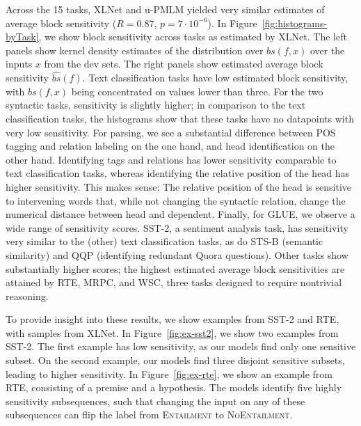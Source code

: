 \documentclass[11pt,a4paper]{article}
\begin{document}
Across the 15 tasks, XLNet and u-PMLM yielded very similar estimates of average block sensitivity ($R=0.87$, $p=7 \cdot 10^{-6}$). 
In Figure~\ref{fig:histograms-byTask}, we show block sensitivity across tasks as estimated by XLNet.
The left panels show kernel density estimates of the distribution over $bs(f,x)$ over the inputs $x$ from the dev sets.
The right panels show estimated average block sensitivity $\widehat{bs}(f)$.
Text classification tasks have low estimated block sensitivity, with $bs(f,x)$ being concentrated on values lower than three.
For the two syntactic tasks, sensitivity is slightly higher; in comparison to the text classification tasks, the histograms show that these tasks have no datapoints with very low sensitivity.
For parsing, we see a substantial difference between POS tagging and relation labeling on the one hand, and head identification on the other hand.
Identifying tags and relations has lower sensitivity comparable to text classification tasks, whereas identifying the relative position of the head has higher sensitivity.
This makes sense: The relative position of the head is sensitive to intervening words that, while not changing the syntactic relation, change the numerical distance between head and dependent.
Finally, for GLUE, we observe a wide range of sensitivity scores.
SST-2, a sentiment analysis task, has sensitivity very similar to the (other) text classification tasks, as do STS-B (semantic similarity) and QQP (identifying redundant Quora questions).
Other tasks show substantially higher scores; the highest estimated average block sensitivities are attained by RTE, MRPC, and WSC, three tasks designed to require nontrivial reasoning.

To provide insight into these results, we show examples from SST-2 and RTE, with samples from XLNet.
In Figure~\ref{fig:ex-sst2}, we show two examples from SST-2. 
The first example has low sensitivity, as our models find only one sensitive subset.
On the second example, our models find three disjoint sensitive subsets, leading to higher sensitivity.
In Figure~\ref{fig:ex-rte}, we show an example from RTE, consisting of a premise and a hypothesis.
The models identify five highly sensitivity subsequences, such that changing the input on any of these subsequences can flip the label from \textsc{Entailment} to \textsc{NoEntailment}.
\end{document}

